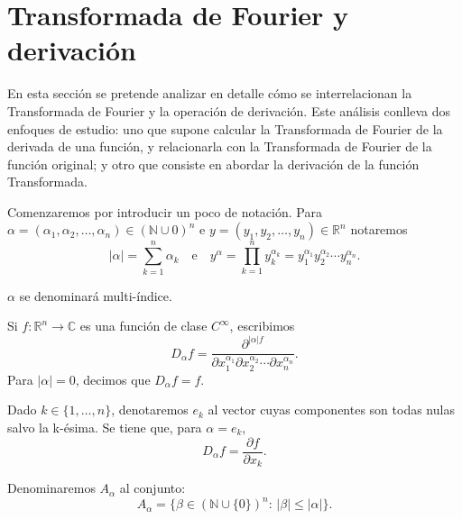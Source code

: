 \section{Transformada de Fourier y derivación}
En esta sección se pretende analizar en detalle cómo se interrelacionan la Transformada de Fourier y la operación de derivación. Este análisis conlleva dos enfoques de estudio: uno que supone calcular la Transformada de Fourier de la derivada de una función, y relacionarla con la Transformada de Fourier de la función original; y otro que consiste en abordar la derivación de la función Transformada.


\noindent Comenzaremos por introducir un poco de notación.
\noindent Para $\alpha = (\alpha_1, \alpha_2, \ldots ,\alpha_n) \in (\mathbb{N} \cup {0})^n$ e $y = (y_1,y_2, \ldots, y_n) \in \mathbb{R}^n$ notaremos
\begin{equation}
|\alpha| = \sum_{k=1}^{n}\alpha_k \quad \text{e} \quad y^\alpha = \prod_{k=1}^{n} y_k^{\alpha_k} = y_{1}^{\alpha_1}y_{2}^{\alpha_2}\cdots y_{n}^{\alpha_n}.
\end{equation}

\noindent $\alpha$ se denominará multi-índice.

\noindent Si $f: \mathbb{R}^n \rightarrow \mathbb{C}$ es una función de clase $C^\infty$, escribimos
\begin{equation}
   D_{\alpha}f = \frac{\partial^{|\alpha|f}}{\partial x_{1}^{\alpha_1}\partial x_{2}^{\alpha_2} \cdots \partial x_{n}^{\alpha_n}}.
\end{equation}
\noindent Para $|\alpha| = 0$, decimos que $ D_{\alpha}f = f$.

\begin{definicion}
    Dado $k \in \{1, \ldots, n\}$, denotaremos $e_k$ al vector cuyas componentes son todas nulas salvo la k-ésima. Se tiene que, para $\alpha = e_k$, 
    \begin{equation}
        D_{\alpha}f = \frac{\partial f}{\partial x_k}.
    \end{equation}
\end{definicion}

\begin{definicion}
    Denominaremos $A_{\alpha}$ al conjunto:
    \begin{equation}
        A_{\alpha} = \{\beta \in (\mathbb{N} \cup \{0\})^n :  \, |\beta| \leq |\alpha|\}.
    \end{equation}
\end{definicion}

